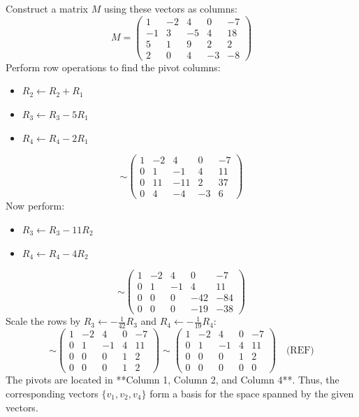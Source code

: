 \documentclass[12pt,a3paper]{article}
\begin{document}
\begin{tcolorbox}[enhanced,breakable,
  colback=cC!4,colframe=cC,boxrule=0.8pt,arc=5pt,
  title={\textbf{Answer --- Basis and Coordinates in $M_{22}$}},
  fonttitle=\bfseries\color{white},colbacktitle=cC]
Construct a matrix $M$ using these vectors as columns:
\[
M = \begin{pmatrix}
1 & -2 & 4 & 0 & -7 \\
-1 & 3 & -5 & 4 & 18 \\
5 & 1 & 9 & 2 & 2 \\
2 & 0 & 4 & -3 & -8
\end{pmatrix}
\]
Perform row operations to find the pivot columns:
\begin{itemize}
    \item $R_2 \leftarrow R_2 + R_1$
    \item $R_3 \leftarrow R_3 - 5R_1$
    \item $R_4 \leftarrow R_4 - 2R_1$
\end{itemize}
\[
\sim \begin{pmatrix}
1 & -2 & 4 & 0 & -7 \\
0 & 1 & -1 & 4 & 11 \\
0 & 11 & -11 & 2 & 37 \\
0 & 4 & -4 & -3 & 6
\end{pmatrix}
\]
Now perform:
\begin{itemize}
    \item $R_3 \leftarrow R_3 - 11R_2$
    \item $R_4 \leftarrow R_4 - 4R_2$
\end{itemize}
\[
\sim \begin{pmatrix}
1 & -2 & 4 & 0 & -7 \\
0 & 1 & -1 & 4 & 11 \\
0 & 0 & 0 & -42 & -84 \\
0 & 0 & 0 & -19 & -38
\end{pmatrix}
\]
Scale the rows by $R_3 \leftarrow -\frac{1}{42}R_3$ and $R_4 \leftarrow -\frac{1}{19}R_4$:
\[
\sim \begin{pmatrix}
1 & -2 & 4 & 0 & -7 \\
0 & 1 & -1 & 4 & 11 \\
0 & 0 & 0 & 1 & 2 \\
0 & 0 & 0 & 1 & 2
\end{pmatrix} \sim \begin{pmatrix}
1 & -2 & 4 & 0 & -7 \\
0 & 1 & -1 & 4 & 11 \\
0 & 0 & 0 & 1 & 2 \\
0 & 0 & 0 & 0 & 0
\end{pmatrix} \quad \text{(REF)}
\]
The pivots are located in **Column 1, Column 2, and Column 4**. Thus, the corresponding vectors $\{v_1, v_2, v_4\}$ form a basis for the space spanned by the given vectors.


\end{tcolorbox}
\end{document}
